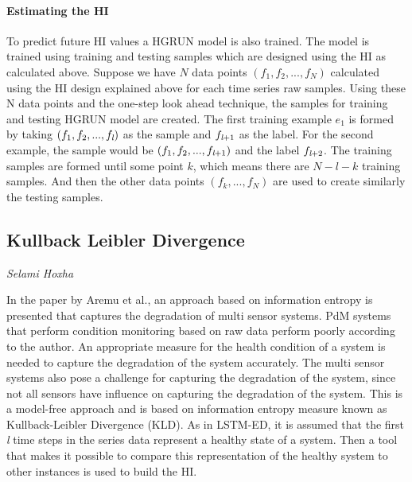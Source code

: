 \paragraph{Estimating the HI}

To predict future HI values a HGRUN model is also trained. The model is trained using training and testing samples which are designed
using the HI as calculated above. Suppose we have $N$ data points $(f_1, f_2, ... , f_N)$ calculated using the HI design explained
above for each time series raw samples. Using these N data points and the one-step look ahead technique, the samples for training and
testing HGRUN model are created. The first training example $e_1$ is formed by taking $(f_1, f_2, ..., f_{\emph{l}})$ as the sample
and $f_{\emph{l}+1}$ as the label. For the second example, the sample would be $(f_1, f_2, ..., f_{\emph{l}+1})$ and the label
$f_{\emph{l}+2}$. The training samples are formed until some point $k$, which means there are $N-l-k$ training samples. And then the
other data points $(f_k, ... , f_N)$ are used to create similarly the testing samples.

\subsection{Kullback Leibler Divergence}
\vspace*{-12.5mm}\hfill{\normalsize\emph{Selami Hoxha}}
\label{sec:hi_estimation:approaches:kullbackLeibler}

In the paper by Aremu et al.,\cite{DBLP:conf/indin/AremuOHM19} an approach based on information entropy is presented that captures the degradation of
multi sensor systems. PdM systems that perform condition monitoring based on raw data perform poorly according to the author.
An appropriate measure for the health condition of a system is needed to capture the degradation of the system accurately.
The multi sensor systems also pose a challenge for capturing the degradation of the system, since not all sensors have influence
on capturing the degradation of the system.  This is a model-free approach and is based on information entropy measure known as
Kullback-Leibler Divergence (KLD). As in LSTM-ED, it is assumed that the first \emph{l} time steps in the series
data represent a healthy state of a system. Then a tool that makes it possible to compare this representation
of the healthy system to other instances is used to build the HI.\\

